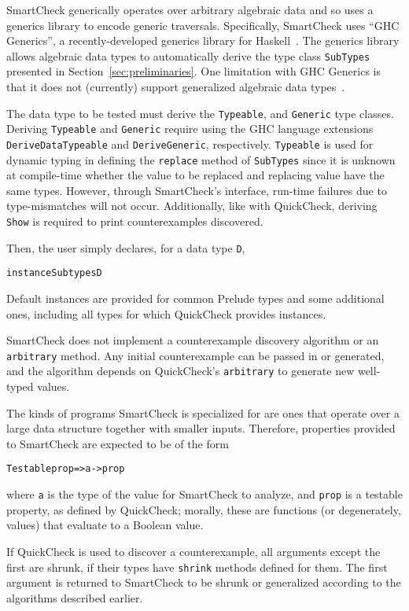 \documentclass{sigplanconf}
\newenvironment{code}{\begin{alltt}\footnotesize}{\end{alltt}}
\newcommand{\ttp}[1]{\texttt{#1}}
\begin{document}
SmartCheck generically operates over arbitrary algebraic data and so uses a
generics library to encode generic traversals.  Specifically, SmartCheck uses
``GHC Generics'', a recently-developed generics library for
Haskell~\cite{generics}.  The generics library allows algebraic data types to
automatically derive the type class \ttp{SubTypes} presented in
Section~\ref{sec:preliminaries}.  One limitation with GHC Generics is that it
does not (currently) support generalized algebraic data types~\cite{gadts}.

The data type to be tested must derive the \ttp{Typeable}, and \ttp{Generic}
type classes.  Deriving \ttp{Typeable} and \ttp{Generic} require using the GHC
language extensions \ttp{DeriveDataTypeable} and \ttp{DeriveGeneric},
respectively.  \ttp{Typeable} is used for dynamic typing in defining the
\ttp{replace} method of \ttp{SubTypes} since it is unknown at compile-time
whether the value to be replaced and replacing value have the same types.
However, through SmartCheck's interface, run-time failures due to
type-mismatches will not occur.  Additionally, like with QuickCheck, deriving
\ttp{Show} is required to print counterexamples discovered.

Then, the user simply declares, for a data type \ttp{D},
%
\begin{code}
instance Subtypes D
\end{code}
%
Default instances are provided for common Prelude types and some additional
ones, including all types for which QuickCheck provides instances.

SmartCheck does not implement a counterexample discovery algorithm or an
\ttp{arbitrary} method.  Any initial counterexample can be passed in or
generated, and the algorithm depends on QuickCheck's \ttp{arbitrary} to generate new
well-typed values.

The kinds of programs SmartCheck is specialized for are ones that operate over a
large data structure together with smaller inputs.  Therefore, properties
provided to SmartCheck are expected to be of the form
%
\begin{code}
Testable prop => a -> prop
\end{code}
%
where \ttp{a} is the type of the value for SmartCheck to analyze, and \ttp{prop}
is a testable property, as defined by QuickCheck; morally, these are functions
(or degenerately, values) that evaluate to a Boolean value.

If QuickCheck is used to discover a counterexample, all arguments except the
first are shrunk, if their types have \ttp{shrink} methods defined for them.
The first argument is returned to SmartCheck to be shrunk or generalized
according to the algorithms described earlier.
\end{document}

